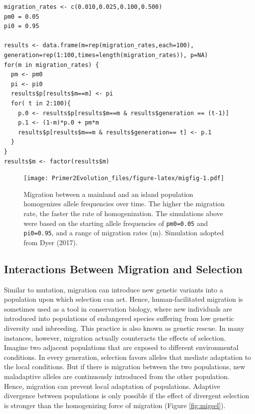 \documentclass[
]{book}
\begin{document}
\begin{verbatim}
migration_rates <- c(0.010,0.025,0.100,0.500)
pm0 = 0.05
pi0 = 0.95

results <- data.frame(m=rep(migration_rates,each=100), generation=rep(1:100,times=length(migration_rates)), p=NA)
for(m in migration_rates) {
  pm <- pm0
  pi <- pi0
  results$p[results$m==m] <- pi
  for( t in 2:100){
    p.0 <- results$p[results$m==m & results$generation == (t-1)]
    p.1 <- (1-m)*p.0 + pm*m
    results$p[results$m==m & results$generation== t] <- p.1
  }
}
results$m <- factor(results$m)
\end{verbatim}

\begin{figure}
\centering
\texttt{[image: Primer2Evolution\_files/figure-latex/migfig-1.pdf]}
\caption{\label{fig:migfig}Migration between a mainland and an island population homogenizes allele frequencies over time. The higher the migration rate, the faster the rate of homogenization. The simulations above were based on the starting allele frequencies of \texttt{pm0=0.05} and \texttt{pi0=0.95}, and a range of migration rates (m). Simulation adopted from Dyer (2017).}
\end{figure}

\hypertarget{interactions-between-migration-and-selection}{%
\subsection{Interactions Between Migration and Selection}\label{interactions-between-migration-and-selection}}

Similar to mutation, migration can introduce new genetic variants into a population upon which selection can act. Hence, human-facilitated migration is sometimes used as a tool in conservation biology, where new individuals are introduced into populations of endangered species suffering from low genetic diversity and inbreeding. This practice is also known as genetic rescue. In many instances, however, migration actually counteracts the effects of selection. Imagine two adjacent populations that are exposed to different environmental conditions. In every generation, selection favors alleles that mediate adaptation to the local conditions. But if there is migration between the two populations, new maladaptive alleles are continuously introduced from the other population. Hence, migration can prevent local adaptation of populations. Adaptive divergence between populations is only possible if the effect of divergent selection is stronger than the homogenizing force of migration (Figure \ref{fig:migsel}).
\end{document}
